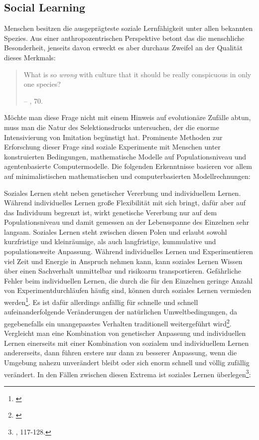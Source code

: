 \documentclass[openany,twoside,twocolumn]{book}
\let\rmarkdownfootnote\footnote%
\def\footnote{\protect\rmarkdownfootnote}
\begin{document}
\hypertarget{social-learning}{%
\subsection{Social Learning}\label{social-learning}}

Menschen besitzen die ausgeprägteste soziale Lernfähigkeit unter allen
bekannten Spezies. Aus einer anthropozentrischen Perspektive betont das
die menschliche Besonderheit, jenseits davon erweckt es aber durchaus
Zweifel an der Qualität dieses Merkmals:

\begin{quote}
What is so \emph{wrong} with culture that it should be really
conspicuous in only one species?

-- \textcite{smith_cultural_1992}, 70.
\end{quote}

Möchte man diese Frage nicht mit einem Hinweis auf evolutionäre Zufälle
abtun, muss man die Natur des Selektionsdrucks untersuchen, der die
enorme Intensivierung von Imitation begünstigt hat. Prominente Methoden
zur Erforschung dieser Frage sind soziale Experimente mit Menschen unter
konstruierten Bedingungen, mathematische Modelle auf Populationsniveau
und agentenbasierte Computermodelle. Die folgenden Erkenntnisse basieren
vor allem auf minimalistischen mathematischen und computerbasierten
Modellrechnungen:

Soziales Lernen steht neben genetischer Vererbung und individuellem
Lernen. Während individuelles Lernen große Flexibilität mit sich bringt,
dafür aber auf das Individuum begrenzt ist, wirkt genetische Vererbung
nur auf dem Populationsniveau und damit gemessen an der Lebensspanne des
Einzelnen sehr langsam. Soziales Lernen steht zwischen diesen Polen und
erlaubt sowohl kurzfristige und kleinräumige, als auch langfristige,
kummulative und populationsweite Anpassung. Während individuelles Lernen
und Experimentieren viel Zeit und Energie in Anspruch nehmen kann, kann
soziales Lernen Wissen über einen Sachverhalt unmittelbar und risikoarm
transportieren. Gefährliche Fehler beim individuellen Lernen, die durch
die für den Einzelnen geringe Anzahl von Experimentdurchläufen häufig
sind, können durch soziales Lernen vermieden werden\footnote{\textcite{boyd_evolution_1988}}.
Es ist dafür allerdings anfällig für schnelle und schnell
aufeinanderfolgende Veränderungen der natürlichen Umweltbedingungen, da
gegebenefalls ein unangepasstes Verhalten traditionell weitergeführt
wird\footnote{\textcite{rogers_does_1988}}. Vergleicht man eine
Kombination von genetischer Anpassung und individuellen Lernen
einerseits mit einer Kombination von sozialem und individuellem Lernen
andererseits, dann führen erstere nur dann zu besserer Anpassung, wenn
die Umgebung nahezu unverändert bleibt oder sich enorm schnell und
völlig zufällig verändert. In den Fällen zwischen diesen Extrema ist
soziales Lernen überlegen\footnote{\textcite{boyd_culture_1985},
  117-128.}:
\end{document}
